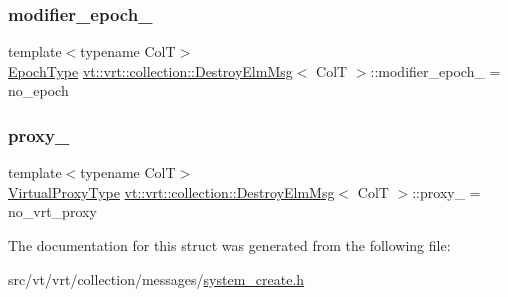 \mbox{\label{structvt_1_1vrt_1_1collection_1_1_destroy_elm_msg_a4614aa0e735c987973c4c790f2d060c2}} 
\subsubsection{\texorpdfstring{modifier\+\_\+epoch\+\_\+}{modifier\_epoch\_}}
{\footnotesize\ttfamily template$<$typename ColT$>$ \\
\hyperlink{namespacevt_a985a5adf291c34a3ca263b3378388236}{Epoch\+Type} \hyperlink{structvt_1_1vrt_1_1collection_1_1_destroy_elm_msg}{vt\+::vrt\+::collection\+::\+Destroy\+Elm\+Msg}$<$ ColT $>$\+::modifier\+\_\+epoch\+\_\+ = no\+\_\+epoch}

\mbox{\label{structvt_1_1vrt_1_1collection_1_1_destroy_elm_msg_aee568f34ec7d082546ef24868870a7aa}} 
\subsubsection{\texorpdfstring{proxy\+\_\+}{proxy\_}}
{\footnotesize\ttfamily template$<$typename ColT$>$ \\
\hyperlink{namespacevt_a1b417dd5d684f045bb58a0ede70045ac}{Virtual\+Proxy\+Type} \hyperlink{structvt_1_1vrt_1_1collection_1_1_destroy_elm_msg}{vt\+::vrt\+::collection\+::\+Destroy\+Elm\+Msg}$<$ ColT $>$\+::proxy\+\_\+ = no\+\_\+vrt\+\_\+proxy}



The documentation for this struct was generated from the following file\+:\begin{DoxyCompactItemize}
\item 
src/vt/vrt/collection/messages/\hyperlink{system__create_8h}{system\+\_\+create.\+h}\end{DoxyCompactItemize}
